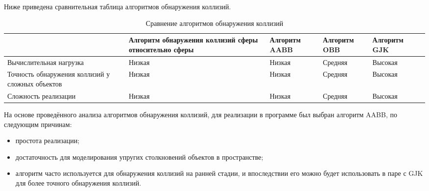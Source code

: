 Ниже приведена сравнительная таблица алгоритмов обнаружения коллизий.

\noindent
\begin{table}[H]
    \caption{Сравнение алгоритмов обнаружения коллизий}
    \label{tab:collisions}
\begin{adjustbox}{width=1\textwidth}
    \begin{tabular}{|p{}|p{}|p{}|p{}|p{}|p{}|}
        \hline
        &
        Алгоритм обнаружения коллизий сферы относительно сферы
        &
        Алгоритм AABB
        &
        Алгоритм OBB
        &
        Алгоритм GJK
        \\
        \hline
        Вычислительная нагрузка
        &
        Низкая
        &
        Низкая
        &
        Средняя
        &
        Высокая
        \\
        \hline
        Точность обнаружения коллизий у сложных объектов
        &
        Низкая
        &
        Низкая
        &
        Средняя
        &
        Высокая
        \\
        \hline
        Сложность реализации
        &
        Низкая
        &
        Низкая
        &
        Средняя
        &
        Высокая
        \\
        \hline
    \end{tabular}
\end{adjustbox}
\end{table}

На основе проведённого анализа алгоритмов обнаружения коллизий, для реализации в программе был выбран алгоритм AABB, по следующим причинам:
\begin{itemize}
    \item простота реализации;
    \item достаточность для моделирования упругих столкновений объектов в пространстве;
    \item алгоритм часто используется для обнаружения коллизий на ранней стадии, и впоследствии его можно будет использовать в паре с GJK для более точного обнаружения коллизий. %
\end{itemize}

